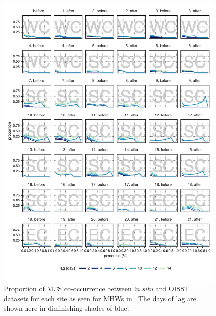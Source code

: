 \documentclass[a4paper,10pt,review]{elsarticle}
\begin{document}
\begin{figure}
\includegraphics[width=1.0\textwidth]{figure5.pdf}
\caption{Proportion of MCS co-occurrence between \emph{in situ} and OISST datasets for each site as seen for MHWs in . The days of lag are shown here in diminishing shades of blue.}
\label{fig:Figure5}
\end{figure}
\end{document}
